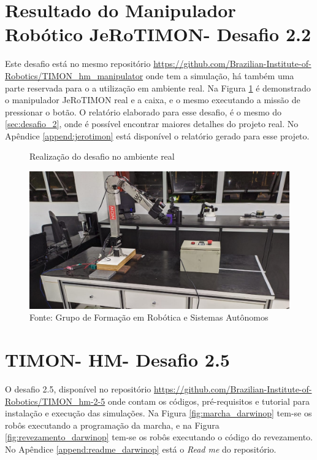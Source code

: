 \section{Resultado do Manipulador Robótico JeRoTIMON- Desafio 2.2 }
\label{sec:desafio_2_2}
Este desafio está no mesmo repositório \url{https://github.com/Brazilian-Institute-of-Robotics/TIMON\_hm\_manipulator} onde tem a simulação, há também uma parte reservada para o a utilização em ambiente real. Na Figura \ref{fig:manipulador_real} é demonstrado o manipulador JeRoTIMON real e a caixa, e o mesmo executando a missão de pressionar o botão. O relatório elaborado para esse desafio, é o mesmo do \ref{sec:desafio_2}, onde é possível encontrar maiores detalhes do projeto real. No Apêndice \ref{append:jerotimon} está disponível o relatório gerado para esse projeto.



\begin{figure}[H]
    \caption{Realização do desafio no ambiente real}
    \centering
    \includegraphics[width= \textwidth]{Figures/manipulador_real.png}
    \caption*{Fonte: Grupo de Formação em Robótica e Sistemas Autônomos}
    \label{fig:manipulador_real}
\end{figure}



\section{TIMON- HM- Desafio 2.5}
\label{sec:desafio_2_5}
O desafio 2.5, disponível no repositório \url{https://github.com/Brazilian-Institute-of-Robotics/TIMON_hm-2-5} onde contam os códigos, pré-requisitos e tutorial para instalação e execução das simulações. Na Figura \ref{fig:marcha_darwinop} tem-se os robôs executando a programação da marcha, e na Figura \ref{fig:revezamento_darwinop} tem-se os robôs executando o código do revezamento. No Apêndice \ref{append:readme_darwinop} está o \textit{Read me} do repositório.



